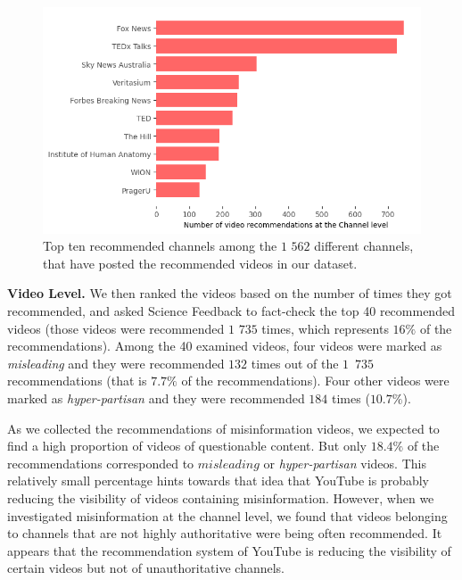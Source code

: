 \documentclass{article}
\begin{document}
\begin{figure}[h]
	\begin{center}
		\includegraphics[scale=0.45]{../figure/reduce_youtube.png} 
	\end{center}
	\caption{Top ten recommended channels among the $1$ $562$ different channels, that have posted the recommended videos in our dataset.}
	\label{reduce_youtube}
\end{figure}

\smallskip 

{\bf Video Level.} 
We then ranked the videos based on the number of times they got recommended, and asked Science Feedback to fact-check the top 40 recommended videos (those videos were recommended $1$ $735$ times, which represents $16\%$ of the recommendations).
Among the 40 examined videos, four videos were marked as {\it misleading} and they were recommended $132$ times out of the $1$~$735$ recommendations (that is $7.7\%$ of the recommendations).
Four other videos were marked as {\it hyper-partisan} and they were recommended $184$ times ($10.7\%$).

\smallskip 

As we collected the recommendations of misinformation videos, we expected to find a high proportion of videos of questionable content.
But only {$18.4\%$} of the recommendations corresponded to $misleading$ or {\it hyper-partisan} videos.
This relatively small percentage hints towards that idea that YouTube is probably reducing the visibility of videos containing misinformation.
However, when we investigated misinformation at the channel level, we found that videos belonging to channels that are not highly authoritative were being often recommended.
It appears that the recommendation system of YouTube is reducing the visibility of certain videos but not of unauthoritative channels.
\end{document}
